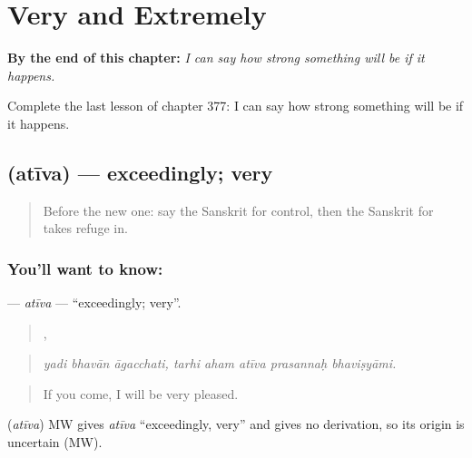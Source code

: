 
\chapter{Very and Extremely}
\label{ch:sa-very-and-extremely}

\begin{chapteropening}
\textbf{By the end of this chapter:} \emph{I can say how strong something will be if it happens.}

Complete the last lesson of chapter 377: I can say how strong something will be if it happens.
\end{chapteropening}

\section[\texorpdfstring{\sk{अतीव} (atīva)}{अतीव (atīva)}]{ (atīva) — exceedingly; very}

\label{lesson:SA-C377-ativa}



\begin{quote}
Before the new one: say the Sanskrit for control, then the Sanskrit for takes refuge in.
\end{quote}

\subsection*{You'll want to know: }
\textbf{} — \emph{atīva} — \textquotedblleft{}exceedingly; very\textquotedblright{}.

\begin{quote}
  ,     
\end{quote}

\begin{quote}
\emph{yadi bhavān āgacchati, tarhi aham atīva prasannaḥ bhaviṣyāmi.}
\end{quote}

\begin{quote}
If you come, I will be very pleased.
\end{quote}

\begin{cousinweb}
\textbf{} (\emph{atīva}) MW gives \emph{atīva} \textquotedblleft{}exceedingly, very\textquotedblright{} and gives no derivation, so its origin is uncertain (MW).
\end{cousinweb}

